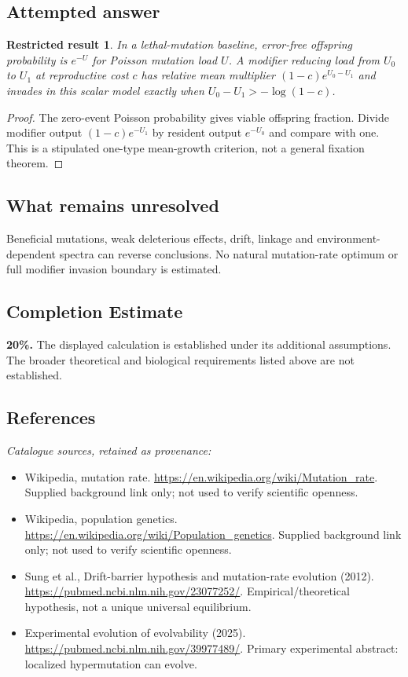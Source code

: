 \documentclass[11pt]{article}
\newtheorem{attemptresult}{Restricted result}[section]
\begin{document}
\subsection{Attempted answer}
\begin{attemptresult}
In a lethal-mutation baseline, error-free offspring probability is $e^{-U}$ for Poisson mutation load $U$. A modifier reducing load from $U_0$ to $U_1$ at reproductive cost $c$ has relative mean multiplier $(1-c)e^{U_0-U_1}$ and invades in this scalar model exactly when $U_0-U_1>-\log(1-c)$.
\end{attemptresult}
\begin{proof}
The zero-event Poisson probability gives viable offspring fraction. Divide modifier output $(1-c)e^{-U_1}$ by resident output $e^{-U_0}$ and compare with one. This is a stipulated one-type mean-growth criterion, not a general fixation theorem.
\end{proof}
\subsection{What remains unresolved}
Beneficial mutations, weak deleterious effects, drift, linkage and environment-dependent spectra can reverse conclusions. No natural mutation-rate optimum or full modifier invasion boundary is estimated.
\subsection{Completion Estimate}
\textbf{20\%.} The displayed calculation is established under its additional assumptions. The broader theoretical and biological requirements listed above are not established.
\subsection{References}
\noindent\emph{Catalogue sources, retained as provenance:}
\begin{itemize}
\item Wikipedia, mutation rate. \url{https://en.wikipedia.org/wiki/Mutation_rate}. Supplied background link only; not used to verify scientific openness.
\item Wikipedia, population genetics. \url{https://en.wikipedia.org/wiki/Population_genetics}. Supplied background link only; not used to verify scientific openness.
\item Sung et al., Drift-barrier hypothesis and mutation-rate evolution (2012). \url{https://pubmed.ncbi.nlm.nih.gov/23077252/}. Empirical/theoretical hypothesis, not a unique universal equilibrium.
\item Experimental evolution of evolvability (2025). \url{https://pubmed.ncbi.nlm.nih.gov/39977489/}. Primary experimental abstract: localized hypermutation can evolve.
\end{itemize}
\clearpage
\end{document}
